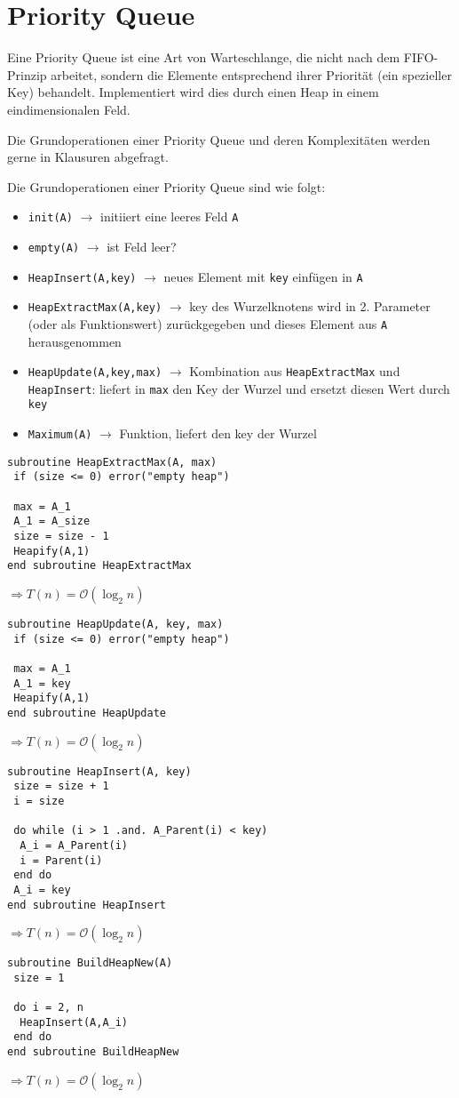 \section{Priority Queue}

Eine Priority Queue ist eine Art von Warteschlange, die nicht nach dem FIFO-Prinzip arbeitet, sondern die Elemente entsprechend ihrer Priorität (ein spezieller Key) behandelt. Implementiert wird dies durch einen Heap in einem eindimensionalen Feld.

\begin{*anmerkung}
	Die Grundoperationen einer Priority Queue und deren Komplexitäten werden gerne in Klausuren abgefragt.
\end{*anmerkung}

Die Grundoperationen einer Priority Queue sind wie folgt:
\begin{itemize}
	\item \texttt{init(A)} $\to$ initiiert eine leeres Feld \texttt{A}
	\item \texttt{empty(A)} $\to$ ist Feld leer?
	\item \texttt{HeapInsert(A,key)} $\to$ neues Element mit \texttt{key} einfügen in \texttt{A}
	\item \texttt{HeapExtractMax(A,key)} $\to$ key des Wurzelknotens wird in 2. Parameter (oder als Funktionswert) zurückgegeben und dieses Element aus \texttt{A} herausgenommen
	\item \texttt{HeapUpdate(A,key,max)} $\to$ Kombination aus \texttt{HeapExtractMax} und \texttt{HeapInsert}: liefert in \texttt{max} den Key der Wurzel und ersetzt diesen Wert durch \texttt{key}
	\item \texttt{Maximum(A)} $\to$ Funktion, liefert den key der Wurzel
\end{itemize}

\begin{lstlisting}
subroutine HeapExtractMax(A, max)
 if (size <= 0) error("empty heap")
 
 max = A_1
 A_1 = A_size
 size = size - 1
 Heapify(A,1)
end subroutine HeapExtractMax
\end{lstlisting}
$\Rightarrow T(n)=\mathcal{O}(\log_2 n)$

\begin{lstlisting}
subroutine HeapUpdate(A, key, max)
 if (size <= 0) error("empty heap")
 
 max = A_1
 A_1 = key
 Heapify(A,1)
end subroutine HeapUpdate
\end{lstlisting}
$\Rightarrow T(n)=\mathcal{O}(\log_2 n)$

\begin{lstlisting}
subroutine HeapInsert(A, key)
 size = size + 1
 i = size
 
 do while (i > 1 .and. A_Parent(i) < key)
  A_i = A_Parent(i)
  i = Parent(i)
 end do
 A_i = key
end subroutine HeapInsert
\end{lstlisting}
$\Rightarrow T(n)=\mathcal{O}(\log_2 n)$

\begin{lstlisting}
subroutine BuildHeapNew(A)
 size = 1
 
 do i = 2, n
  HeapInsert(A,A_i)
 end do
end subroutine BuildHeapNew
\end{lstlisting}
$\Rightarrow T(n)=\mathcal{O}(\log_2 n)$